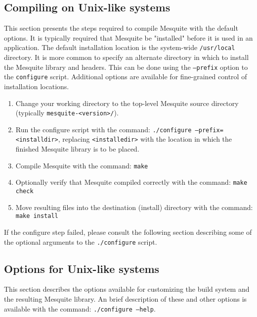 \subsection{Compiling on Unix-like systems}
This section presents the steps required to compile Mesquite with the default
options.  It is typically required
that Mesquite be "installed" before it is used in an application.  The default 
installation location is the system-wide \texttt{/usr/local} directory.  
It is more common to specify an alternate directory in which to install 
the Mesquite library and headers.  This can be done using the \texttt{--prefix}
option to the \texttt{configure} script.  Additional options are available for
fine-grained control of installation locations.
\begin{enumerate}
\item Change your working directory to the top-level Mesquite source
      directory (typically \texttt{mesquite-<version>/}).
\item Run the configure script with the command: \texttt{./configure --prefix=<installdir>},
      replacing \texttt{<installedir>} with the location in which the finished
      Mesquite library is to be placed.
\item Compile Mesquite with the command: \texttt{make} 
\item Optionally verify that Mesquite compiled correctly with the command: \texttt{make check}
\item Move resulting files into the destination (install) directory with the command: \texttt{make install}
\end{enumerate}
If the configure step failed, please consult the following section describing 
some of the optional arguments to the \texttt{./configure} script. 
\subsection{Options for Unix-like systems}
This section describes the options available for customizing the build
system and the resulting Mesquite library.  An brief description of these
and other options is available with the command: \texttt{./configure --help}.

